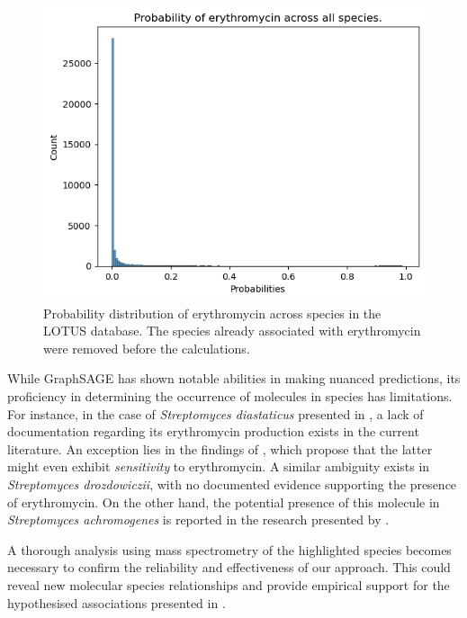 \documentclass[
11pt, %
oneside, %
english, %
singlespacing, %
headsepline, %
chapterinoneline, %
]{MastersDoctoralThesis} %
\begin{document}
\begin{figure}[h]
	\centering
	\includegraphics[scale=0.7]{figure/erythromycin}
	\caption{Probability distribution of erythromycin across species in the LOTUS database. The species already associated with erythromycin were removed before the calculations.}
	\label{fig: hist erythromycin}
\end{figure}

While GraphSAGE has shown notable abilities in making nuanced predictions, its proficiency in determining the occurrence of molecules in species has limitations. For instance, in the case of \textit{Streptomyces diastaticus} presented in , a lack of documentation regarding its erythromycin production exists in the current literature. An exception lies in the findings of \cite{graham23SRibosomalRibonucleic1979}, which propose that the latter might even exhibit \textit{sensitivity} to erythromycin. A similar ambiguity exists in \textit{Streptomyces drozdowiczii}, with no documented evidence supporting the presence of erythromycin. On the other hand, the potential presence of this molecule in \textit{Streptomyces achromogenes} is reported in the research presented by \cite{moosawiComputationalPredictionProperties2010}.

A thorough analysis using mass spectrometry of the highlighted species becomes necessary to confirm the reliability and effectiveness of our approach. This could reveal new molecular species relationships and provide empirical support for the hypothesised associations presented in .
\end{document}
